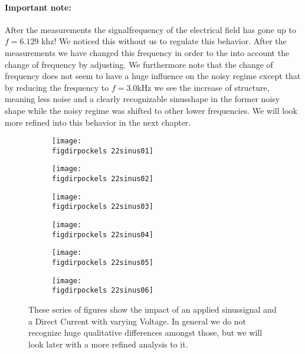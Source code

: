 \paragraph{Important note:} After the measurements the
signalfrequency of the electrical field has gone up to 
$f=6.129$ khz! We noticed this without us to regulate this 
behavior. After the measurements we have changed this frequency in
order to the into account the change of frequency by adjusting.
We furthermore note that the change of frequency
does not seem to have a huge influence on the noisy regime except
that by reducing the frequency to $f=3.0$kHz we see the increase
of structure, meaning less noise and a clearly recognizable
sinusshape in the former noisy shape while the noisy regime
was shifted to other lower frequencies. We will look more refined
into this behavior in the next chapter.
\begin{figure}
    \begin{subfigure}[b]{\picwidth}
        \texttt{[image: \\figdirpockels 22sinus01]}
        \caption{}
    \end{subfigure}\qquad
    \begin{subfigure}[b]{\picwidth}
        \texttt{[image: \\figdirpockels 22sinus02]}
        \caption{}
    \end{subfigure}
    \begin{subfigure}[b]{\picwidth}
        \texttt{[image: \\figdirpockels 22sinus03]}
        \caption{}
    \end{subfigure}
    \begin{subfigure}[b]{\picwidth}
        \texttt{[image: \\figdirpockels 22sinus04]}
        \caption{}
    \end{subfigure}
    \begin{subfigure}[b]{\picwidth}
        \texttt{[image: \\figdirpockels 22sinus05]}
        \caption{}
    \end{subfigure}
    \begin{subfigure}[b]{\picwidth}
        \texttt{[image: \\figdirpockels 22sinus06]}
        \caption{}
    \end{subfigure}

    \caption{These series of figures show the impact of
        an applied sinussignal and a Direct Current with
        varying Voltage. In general we do not recognize huge 
        qualitative differences amongst those, but we will look
        later with a more refined analysis to it.}
    \label{fig:sinus1}
\end{figure}
